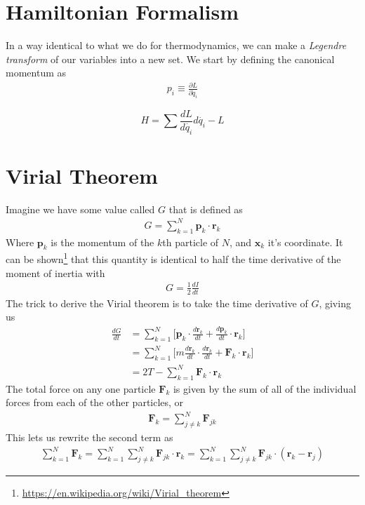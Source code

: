 \section{Hamiltonian Formalism}
In a way identical to what we do for thermodynamics, we can make a \emph{Legendre transform} of our variables into a new set. We start by defining the canonical momentum as
\begin{align}
p_i \equiv \frac{\partial L}{\partial \dot{q}_i}
\end{align}

$$H = \sum\frac{dL}{d\dot{q_i}}d\dot{q_i} - L$$

\section{Virial Theorem}
Imagine we have some value called $G$ that is defined as
\begin{align}
G = \sum_{k=1}^N \textbf{p}_k\cdot\textbf{r}_k
\end{align}
Where $\textbf{p}_k$ is the momentum of the $k$th particle of $N$, and $\textbf{x}_k$ it's coordinate. It can be shown\footnote{\url{https://en.wikipedia.org/wiki/Virial_theorem}} that this quantity is identical to half the time derivative of the moment of inertia with
\begin{align}
G = \frac{1}{2}\frac{dI}{dt}
\end{align}
The trick to derive the Virial theorem is to take the time derivative of $G$, giving us
\begin{align}
\frac{dG}{dt} &= \sum_{k=1}^N \Big[\textbf{p}_k\cdot\frac{d\textbf{r}_k}{dt} + \frac{d\textbf{p}_k}{dt}\cdot\textbf{r}_k\Big]\\
&= \sum_{k=1}^N \Big[m\frac{d\textbf{r}_k}{dt}\cdot\frac{d\textbf{r}_k}{dt} + \textbf{F}_k\cdot\textbf{r}_k\Big]\\
&= 2T - \sum_{k=1}^N \textbf{F}_k\cdot\textbf{r}_k
\end{align}
The total force on any one particle $\textbf{F}_k$ is given by the sum of all of the individual forces from each of the other particles, or
\begin{align}
\textbf{F}_k = \sum_{j\neq k}^N \textbf{F}_{jk}
\end{align}
This lets us rewrite the second term as
\begin{align}
\sum_{k=1}^N \textbf{F}_k = \sum_{k=1}^N \sum_{j\neq k}^N \textbf{F}_{jk}\cdot\textbf{r}_k = \sum_{k=1}^N \sum_{j\neq k}^N \textbf{F}_{jk}\cdot(\textbf{r}_k - \textbf{r}_j)
\end{align}

